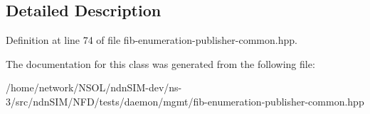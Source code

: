 \subsection{Detailed Description}


Definition at line 74 of file fib-\/enumeration-\/publisher-\/common.\+hpp.



The documentation for this class was generated from the following file\+:\begin{DoxyCompactItemize}
\item 
/home/network/\+N\+S\+O\+L/ndn\+S\+I\+M-\/dev/ns-\/3/src/ndn\+S\+I\+M/\+N\+F\+D/tests/daemon/mgmt/fib-\/enumeration-\/publisher-\/common.\+hpp\end{DoxyCompactItemize}
